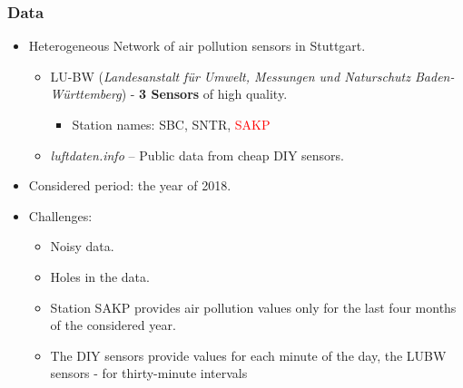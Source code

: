 \documentclass[18pt]{beamer}
\begin{document}
\begin{frame}
  \frametitle{Data}
  \begin{itemize}
  \item Heterogeneous Network of air pollution sensors in Stuttgart.\\
    \begin{itemize}
    \item LU-BW (\textit{Landesanstalt für Umwelt, Messungen und Naturschutz Baden-Württemberg}) - \textbf{3 Sensors} of high quality.
      \begin{itemize}
      \item Station names: SBC, SNTR, \textcolor{red}{SAKP}
      \end{itemize}
    \item \textit{luftdaten.info} -- Public data from cheap DIY sensors.
    \end{itemize}
  \item Considered period: the year of 2018.
  \item Challenges:
    \begin{itemize}
    \item Noisy data.
    \item Holes in the data.
    \item Station SAKP provides air pollution values only for the last four months of the considered year.
    \item The DIY sensors provide values for each minute of the day, the LUBW sensors - for thirty-minute
intervals
    \end{itemize}
  \end{itemize}
\end{frame}
\end{document}

